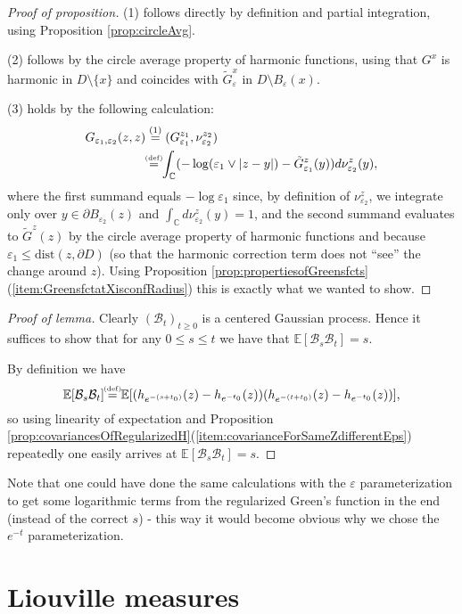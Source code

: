 \documentclass[11pt,reqno]{amsart}
\numberwithin{equation}{section}
\newcommand{\eqby}[1]{\mathrel{\stackrel{#1}{=}}}
\newcommand{\eqbydef}{\mathrel{\stackrel{\hspace*{-3mm}\text{\tiny(def)}\hspace*{-3mm}}{=}}}
\newcommand{\eps}{\varepsilon}
\begin{document}
\begin{proof}[Proof of proposition]
	(1) follows directly by definition and partial integration, using Proposition \ref{prop:circleAvg}.
	
	(2) follows by the circle average property of harmonic functions, using that $G^x$ is harmonic in $D\setminus\{x\}$ and coincides with $\tilde G^x_\eps$ in $D\setminus B_\eps(x)$.
	
	(3) holds by the following calculation:
	\begin{align*}
		G_{\eps_1,\eps_2}(z,z)&\eqby{(1)}(G_{\eps_1}^{z_1},\nu_{\eps_2}^{z_2})\\
		&\eqbydef \int_\mathbb{C}(-\log(\eps_1\vee |z-y|)-\tilde G_{\eps_1}^z(y))d\nu_{\eps_2}^z(y),
	\end{align*}
	where the first summand equals $-\log\eps_1$ since, by definition of $\nu_{\eps_2}^z$, we integrate only over $y\in\partial B_{\eps_2}(z)$ and $\int_\mathbb{C}d\nu_{\eps_2}^z(y)=1$, and the second summand evaluates to $\tilde G^z(z)$ by the circle average property of harmonic functions and because $\eps_1\leq\text{dist}(z,\partial D)$ (so that the harmonic correction term does not ``see'' the change around $z$). Using Proposition \ref{prop:propertiesofGreensfcts}(\ref{item:GreensfctatXisconfRadius}) this is exactly what we wanted to show.
\end{proof}

\begin{proof}[Proof of lemma]
	Clearly $(\mathcal B_t)_{t\geq 0}$ is a centered Gaussian process. Hence it suffices to show that for any $0\leq s\leq t$ we have that $\mathbb E[\mathcal B_s\mathcal B_t] = s$. 
	
	By definition we have $$\mathbb E[\mathcal B_s\mathcal B_t]\eqbydef \mathbb E[(h_{e^{-(s+t_0)}}(z)-h_{e^{-t_0}}(z))(h_{e^{-(t+t_0)}}(z)-h_{e^{-t_0}}(z))],$$ so using linearity of expectation and Proposition \ref{prop:covariancesOfRegularizedH}(\ref{item:covarianceForSameZdifferentEps}) repeatedly one easily arrives at $\mathbb E[\mathcal B_s\mathcal B_t] = s$.
\end{proof}

Note that one could have done the same calculations with the $\eps$ parameterization to get some logarithmic terms from the regularized Green's function in the end (instead of the correct $s$) - this way it would become obvious why we chose the $e^{-t}$ parameterization.

\section{Liouville measures}
\end{document}
